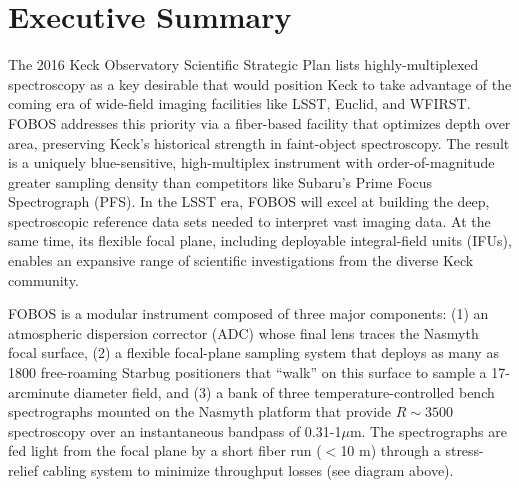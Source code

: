 
\section*{Executive Summary}


The 2016 Keck Observatory Scientific Strategic Plan lists
highly-multiplexed spectroscopy as a key desirable that would
position Keck to take advantage of the coming era of wide-field
imaging facilities like LSST, Euclid, and WFIRST. FOBOS addresses
this priority via a fiber-based facility that optimizes depth over
area, preserving Keck's historical strength in faint-object
spectroscopy. The result is a uniquely blue-sensitive, high-multiplex
instrument with order-of-magnitude greater sampling density than
competitors like Subaru's Prime Focus Spectrograph (PFS). In the LSST
era, FOBOS will excel at building the deep, spectroscopic reference
data sets needed to interpret vast imaging data. At the same time,
its flexible focal plane, including deployable integral-field units
(IFUs), enables an expansive range of scientific investigations from
the diverse Keck community.

FOBOS is a modular instrument composed of three major components: (1)
an atmospheric dispersion corrector (ADC) whose final lens traces the
Nasmyth focal surface, (2) a flexible focal-plane sampling system
that deploys as many as 1800 free-roaming Starbug positioners that
``walk'' on this surface to sample a 17-arcminute diameter field, and
(3) a bank of three temperature-controlled bench spectrographs
mounted on the Nasmyth platform that provide $R \sim 3500$
spectroscopy over an instantaneous bandpass of 0.31-1$\mu$m. The
spectrographs are fed light from the focal plane by a short fiber run
($<$10 m) through a stress-relief cabling system to minimize
throughput losses (see diagram above).

